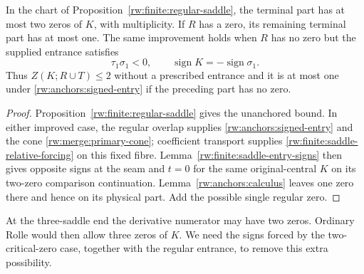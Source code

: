 \begin{proposition}
\label{rw:anchors:regular-saddle}
In the chart of Proposition~\ref{rw:finite:regular-saddle}, the terminal
part has at most two zeros of $K$, with multiplicity. If $R$ has a zero,
its remaining terminal part has at most one. The same improvement holds
when $R$ has no zero but the supplied entrance satisfies
\begin{equation}\label{rw:anchors:signed-entry}
 \tau_1\sigma_1<0,\qquad
 \operatorname{sign}K=-\operatorname{sign}\sigma_1.
\end{equation}
Thus $Z(K;R\cup T)\le2$ without a prescribed entrance and it is
at most one under \eqref{rw:anchors:signed-entry} if the preceding
part has no zero.
\end{proposition}
\begin{proof}
Proposition~\ref{rw:finite:regular-saddle} gives the unanchored bound.
In either improved case, the regular overlap supplies
\eqref{rw:anchors:signed-entry} and the cone
\eqref{rw:merge:primary-cone}; coefficient transport supplies
\eqref{rw:finite:saddle-relative-forcing} on this fixed fibre.
Lemma~\ref{rw:finite:saddle-entry-signs} then gives opposite signs
at the seam and $t=0$ for the same original-central $K$ on its
two-zero comparison continuation. Lemma~\ref{rw:anchors:calculus}
leaves one zero there and hence on its physical part. Add the
possible single regular zero.
\end{proof}

At the three-saddle end the derivative numerator may have two zeros.
Ordinary Rolle would then allow three zeros of $K$. We need the signs
forced by the two-critical-zero case, together with the regular entrance,
to remove this extra possibility.

